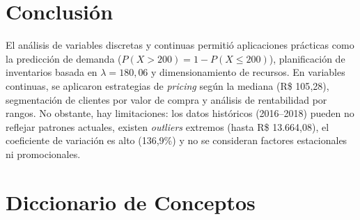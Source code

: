 \documentclass[12pt,a4paper,twoside]{article}
\begin{document}
\section{Conclusión}
\small
El análisis de variables discretas y continuas permitió aplicaciones prácticas como la predicción de demanda ($P(X > 200) = 1 - P(X \leq 200)$), planificación de inventarios basada en $\lambda = 180{,}06$ y dimensionamiento de recursos. En variables continuas, se aplicaron estrategias de \textit{pricing} según la mediana (R\$ 105{,}28), segmentación de clientes por valor de compra y análisis de rentabilidad por rangos. No obstante, hay limitaciones: los datos históricos (2016--2018) pueden no reflejar patrones actuales, existen \textit{outliers} extremos (hasta R\$ 13.664{,}08), el coeficiente de variación es alto (136{,}9\%) y no se consideran factores estacionales ni promocionales.

\section{Diccionario de Conceptos}
\end{document}
